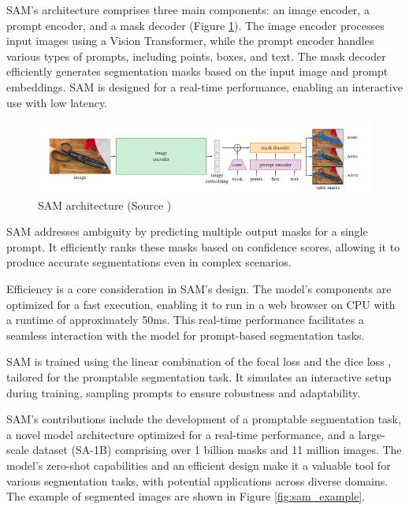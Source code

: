 SAM's architecture comprises three main components: an image encoder, a prompt encoder, and a mask decoder (Figure \ref{fig:sam_architecture}). The
image encoder processes input images using a Vision Transformer, while the prompt encoder handles various types of
prompts, including points, boxes, and text. The mask decoder efficiently generates segmentation masks based on the
input image and prompt embeddings. SAM is designed for a real-time performance, enabling an interactive use with low
latency.

\begin{figure}[h]
  \centering
  \includegraphics[width=\linewidth]{text/chapter_03/imgs/sam}
  \caption{SAM architecture (Source \cite{SAM2023})}
  \label{fig:sam_architecture}
\end{figure}

SAM addresses ambiguity by predicting multiple output masks for a single prompt. It efficiently ranks these masks based on confidence scores, allowing it to produce accurate segmentations even in complex scenarios.

Efficiency is a core consideration in SAM's design. The model's components are optimized for a fast execution,
enabling it to run in a web browser on CPU with a runtime of approximately 50ms. This real-time performance
facilitates a seamless interaction with the model for prompt-based segmentation tasks.

SAM is trained using the linear combination of the focal loss \cite{FocalLoss2020} and the dice loss \cite{DiceLoss2016},
tailored for the
promptable segmentation
task. It simulates an interactive setup during training, sampling prompts to ensure robustness and adaptability.

SAM's contributions include the development of a promptable segmentation task, \linebreak a novel model architecture optimized
for a real-time performance, and a large-scale dataset (SA-1B) comprising over 1 billion masks and 11 million images.
The model's zero-shot capabilities and an efficient design make it a valuable tool for various segmentation tasks, with
potential applications across diverse domains. The example of segmented images are shown in Figure \ref{fig:sam_example}.

